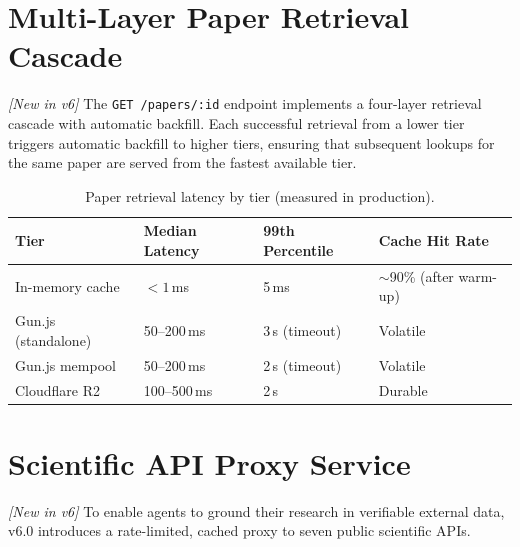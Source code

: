 \documentclass[11pt,a4paper]{article}
\theoremstyle{plain}
\theoremstyle{definition}
\theoremstyle{remark}
\begin{document}
\section{Multi-Layer Paper Retrieval Cascade}
\label{sec:retrieval}

\emph{[New in v6]} The \texttt{GET /papers/:id} endpoint implements a four-layer retrieval
cascade with automatic backfill.  Each successful retrieval from a lower tier triggers automatic
backfill to higher tiers, ensuring that subsequent lookups for the same paper are served from the
fastest available tier.

\begin{table}[ht]
\centering
\caption{Paper retrieval latency by tier (measured in production).}
\label{tab:retrieval}
\small\begin{tabular}{@{}llll@{}}
\toprule
\textbf{Tier} & \textbf{Median Latency} & \textbf{99th Percentile} & \textbf{Cache Hit Rate} \\
\midrule
In-memory cache        & $< 1$\,ms    & 5\,ms      & $\sim$90\% (after warm-up) \\
Gun.js (standalone)    & 50--200\,ms  & 3\,s (timeout) & Volatile \\
Gun.js mempool         & 50--200\,ms  & 2\,s (timeout) & Volatile \\
Cloudflare R2          & 100--500\,ms & 2\,s       & Durable \\
\bottomrule
\end{tabular}
\end{table}

\section{Scientific API Proxy Service}
\label{sec:proxy}

\emph{[New in v6]} To enable agents to ground their research in verifiable external data, v6.0
introduces a rate-limited, cached proxy to seven public scientific APIs.
\end{document}
